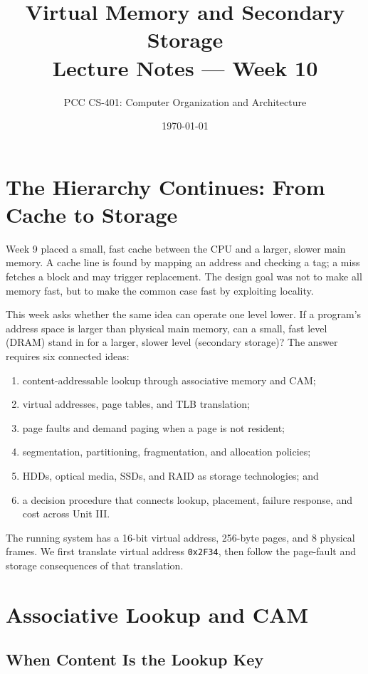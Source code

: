 \documentclass[11pt]{article}
\title{Virtual Memory and Secondary Storage\\\large Lecture Notes --- Week 10}
\author{PCC CS-401: Computer Organization and Architecture}
\date{\today}
\begin{document}
\maketitle

\section{The Hierarchy Continues: From Cache to Storage}
\label{sec:intro}

Week 9 placed a small, fast cache between the CPU and a larger, slower main
memory. A cache line is found by mapping an address and checking a tag; a miss
fetches a block and may trigger replacement. The design goal was not to make
all memory fast, but to make the common case fast by exploiting locality.

This week asks whether the same idea can operate one level lower. If a
program's address space is larger than physical main memory, can a small,
fast level (DRAM) stand in for a larger, slower level (secondary storage)? The
answer requires six connected ideas:
\begin{enumerate}
  \item content-addressable lookup through associative memory and CAM;
  \item virtual addresses, page tables, and TLB translation;
  \item page faults and demand paging when a page is not resident;
  \item segmentation, partitioning, fragmentation, and allocation policies;
  \item HDDs, optical media, SSDs, and RAID as storage technologies; and
  \item a decision procedure that connects lookup, placement, failure
        response, and cost across Unit III.
\end{enumerate}

The running system has a 16-bit virtual address, 256-byte pages, and 8
physical frames. We first translate virtual address \texttt{0x2F34}, then
follow the page-fault and storage consequences of that translation.

\section{Associative Lookup and CAM}
\label{sec:associative}

\subsection{When Content Is the Lookup Key}
\end{document}
